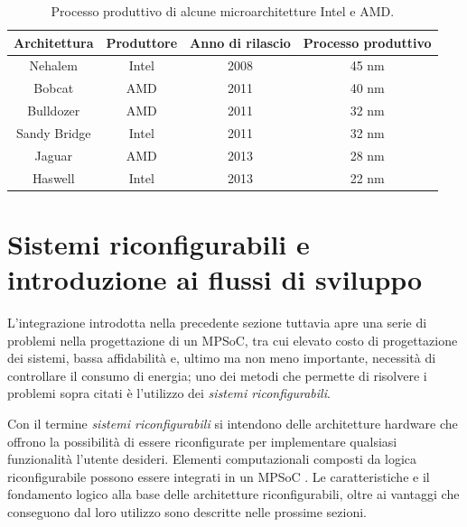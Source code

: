 \begin{table}[t]
  \begin{center}
    \begin{tabular}{|c|c|c|c|}
      \hline
      \textbf{Architettura} & \textbf{Produttore} & \textbf{Anno di rilascio} & \textbf{Processo produttivo}\\
      \hline
      Nehalem & Intel & 2008 & 45 nm\\
      \hline
      Bobcat & AMD & 2011 & 40 nm\\
      \hline
      Bulldozer & AMD & 2011 & 32 nm\\
      \hline
      Sandy Bridge & Intel & 2011 & 32 nm\\
      \hline
      Jaguar & AMD & 2013 & 28 nm\\
      \hline
      Haswell & Intel & 2013 & 22 nm\\
      \hline
    \end{tabular}
    \caption[Processo produttivo di alcune microarchitetture Intel e AMD]{Processo produttivo di alcune microarchitetture Intel
      \cite{IntelTransistor, IntelsVision} e AMD.}
    \label{tab:processoProduttivo}
  \end{center}
\end{table}



\section{Sistemi riconfigurabili e introduzione ai flussi di sviluppo}
\label{sec:reconfComp}
L'integrazione introdotta nella precedente sezione tuttavia apre una serie di problemi nella progettazione
di un \ac{MPSoC}, tra cui elevato costo di progettazione dei sistemi, bassa affidabilità e, ultimo
ma non meno importante, necessità di controllare il consumo di energia; uno dei metodi che 
permette di risolvere i problemi sopra citati  \`e l'utilizzo dei \emph{sistemi riconfigurabili}.

Con il termine \emph{sistemi riconfigurabili} si intendono delle architetture hardware che 
offrono la possibilità di essere riconfigurate per implementare qualsiasi funzionalità 
l'utente desideri. Elementi computazionali composti da logica riconfigurabile possono essere integrati in un
\ac{MPSoC} \cite{EmbeddedReconfigurableArchitectures}. Le caratteristiche e il fondamento logico alla
base delle architetture riconfigurabili,
oltre ai vantaggi che conseguono dal loro utilizzo sono descritte nelle prossime sezioni.


